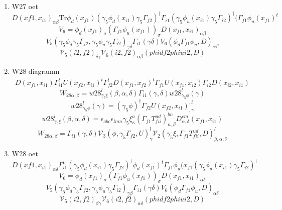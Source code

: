 \documentclass{article}[12pt]
\begin{document}
\begin{itemize}
\begin{enumerate}
\item W27 oet
$$
D(x{f1},x_{i1})_{\alpha\beta}\mathrm{Tr}
\phi_d(x_{f1})(\gamma_5\phi_d(x_{i1})\gamma_5\Gamma_{f2})^\dagger
\Gamma_{i1}(\gamma_5\phi_u(x_{i1})\gamma_5\Gamma_{i2})^\dagger(\Gamma_{f1}\phi_u(x_{f1})^t
$$
$$
V_6=\phi_d(x_{f1})_{\sigma}(\Gamma_{f1}\phi_u(x_{f1}))_{\sigma}D(x_{f1},x_{i1})_{\alpha\beta}
$$
$$
V_5(\gamma_5\phi_d\gamma_5\Gamma_{f2},\gamma_5\phi_u\gamma_5\Gamma_{i2})_{\gamma\delta}\Gamma_{i1}(\gamma\delta)V_6(\phi_d\Gamma_{f1}\phi_u,D)_{\alpha\beta}
$$
$$
{\mathcal V}_5(i2,f2)_{\delta\gamma}{\mathcal V}_6(i2,f2)_{\alpha\beta}(phidf2phiui2,D)
$$
\item W28 diagramm
\begin{eqnarray}
D(x_{f1},x_{i1})\Gamma_{i1}^tU(x_{f2},x_{i1})^t\Gamma_{f2}^tD(x_{f1},x_{f2})^t\Gamma_{f1}U(x_{f1},x_{i2})\Gamma_{i2}D(x_{i2},x_{i1})
\end{eqnarray}
$$
W_{28\alpha,\beta}=w28_{\gamma_5\xi}^{l}\left(\beta,\alpha,\delta\right)\Gamma_{i1}\left(\gamma,\delta\right)w28_{\gamma_5\phi}^{l}\left(\gamma\right)
$$
$$
w28_{\gamma_5\phi}^{l}\left(\gamma\right)=(\gamma_5\phi)^{\dagger}\Gamma_{f2}U\left(x_{f2},x_{i1}\right)^{,l}_{,\gamma}
$$
$$
w28_{\gamma_5\xi}^{l}\left(\beta,\alpha,\delta\right)=\epsilon_{abc}\epsilon_{lmn}\gamma_5\xi^{a}_{\kappa}\left(\Gamma_{f1}T_{fii}^{ud}\right)^{bn}_{\kappa,\beta}D^{cm}_{\alpha,\delta}\left(x_{f1},x_{i1}\right)
$$
$$
W_{28\alpha,\beta}=\Gamma_{i1}\left(\gamma,\delta\right){\mathcal V}_{3}\left(\phi,\gamma_5\Gamma_{f2},U\right)^{l}_{\gamma}{\mathcal V}_{2}\left(\gamma_5\xi,\Gamma_{f1}T_{fii}^{ud},D\right)^{l}_{\beta,\alpha,\delta}
$$

\item W28 oet
$$
D(x{f1},x_{i1})_{\alpha\delta}\Gamma_{i1}^t(\gamma_5\phi_d(x_{i1})\gamma_5\Gamma_{f2})^\dagger
\phi_d(x_{f1})^t\Gamma_{f1}\phi_u(x_{f1}
(\gamma_5\phi_u(x_{i1})\gamma_5\Gamma_{i2})^\dagger
$$
$$
V_6=\phi_d(x_{f1})_{\sigma}(\Gamma_{f1}\phi_u(x_{f1}))_{\sigma}D(x_{f1},x_{i1})_{\alpha\delta}
$$
$$
V_5(\gamma_5\phi_d\gamma_5\Gamma_{f2},\gamma_5\phi_u\gamma_5\Gamma_{i2})_{\gamma\beta}\Gamma_{i1}(\gamma\delta)V_6(\phi_d\Gamma_{f1}\phi_u,D)_{\alpha\delta}
$$
$$
{\mathcal V}_5(i2,f2)_{\beta\gamma}{\mathcal V}_6(i2,f2)_{\alpha\delta}(phidf2phiui2,D)
$$


\end{enumerate}
\end{itemize}
\end{document}
